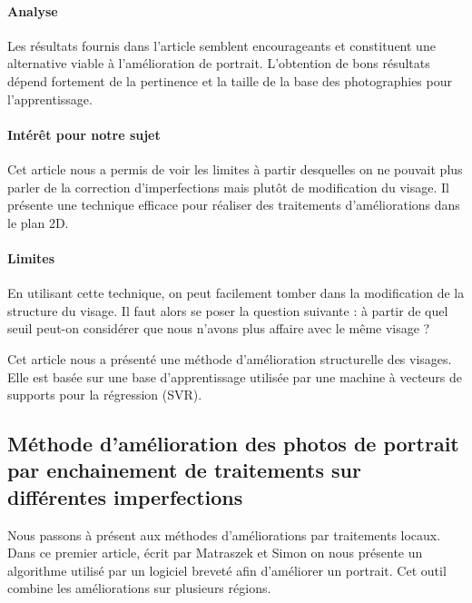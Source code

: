 \documentclass[11pt, french]{report-rd-info}
\begin{document}
\paragraph{Analyse}
Les résultats fournis dans l’article semblent encourageants et constituent une alternative viable à l’amélioration de portrait. L’obtention de bons résultats dépend fortement de la pertinence et la taille de la base des photographies pour l’apprentissage.

\paragraph{Intérêt pour notre sujet}
Cet article nous a permis de voir les limites à partir desquelles on ne pouvait plus parler de la correction d’imperfections mais plutôt de modification du visage. Il présente une technique efficace pour réaliser des traitements d’améliorations dans le plan 2D. 

\paragraph{Limites}
En utilisant cette technique, on peut facilement tomber dans la modification de la structure du visage. Il faut alors se poser la question suivante : à partir de quel seuil peut-on considérer que nous n’avons plus affaire avec le même visage ?

Cet article nous a présenté une méthode d’amélioration structurelle des visages. Elle est basée sur une base d’apprentissage utilisée par une machine à vecteurs de supports pour la régression (SVR).

\subsection{Méthode d’amélioration des photos de portrait par enchainement de traitements sur différentes imperfections}
Nous passons à présent aux méthodes d’améliorations par traitements locaux. Dans ce premier article, écrit par Matraszek et Simon\cite{Matraszek2004} on nous présente un algorithme utilisé par un logiciel breveté afin d'améliorer un portrait. Cet outil combine les améliorations sur plusieurs régions.
\end{document}
